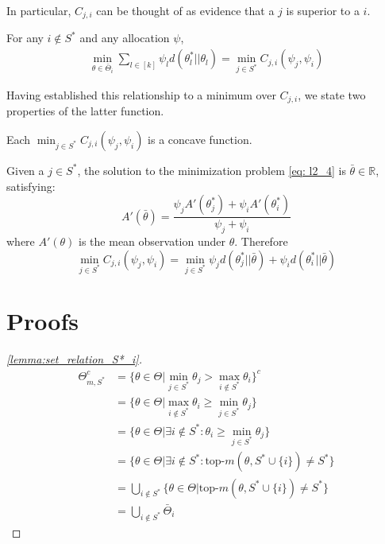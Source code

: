 In particular, $C_{j, i}$ can be thought of as evidence that a $j$ is superior to a $i$.

\begin{lemma}\label{lemma:kl_to_C}
  For any $i \notin S^*$ and any allocation $\psi$,
  \begin{align}
    \min_{\theta \in \bar{\Theta}_i} \sum_{l \in [k]}\psi_l d(\theta^*_l||\theta_l) = \min_{j \in S^*} C_{j, i}(\psi_j, \psi_i)
  \end{align}
\end{lemma}

Having established this relationship to a minimum over $C_{j, i}$, we state two properties of the latter function.

\begin{lemma}\label{lemma:C_concave}
  Each $\min_{j \in S^*} C_{j, i}(\psi_j, \psi_i)$ is a concave function.
\end{lemma}

\begin{lemma}\label{lemma:C_unique_solution}
  Given a $j \in S^*$, the solution to the minimization problem \eqref{eq: l2_4} is $\bar{\theta} \in \mathbb{R}$, satisfying:
  \[A'(\bar{\theta}) = \frac{\psi_j A'(\theta_j^*) + \psi_i A'(\theta_i^*)}{\psi_j + \psi_i}\]
  where $A'(\theta)$ is the mean observation under $\theta$. Therefore
  \[\min_{j \in S^*} C_{j, i}(\psi_j, \psi_i) = \min_{j \in S^*} \psi_j d(\theta^*_j || \bar{\theta}) + \psi_i d(\theta^*_i || \bar{\theta})\]
\end{lemma}

\section{Proofs}
\begin{proof}[\ref{lemma:set_relation_S*_i}]
  \begin{align}
    \Theta_{m, S^*}^c &= \{\theta \in \Theta | \min_{j \in S^*} \theta_j > \max_{i \notin S^*} \theta_i \}^c \\
    &= \{\theta \in \Theta | \max_{i \notin S^*} \theta_i \geq \min_{j \in S^*} \theta_j\} \\
    &= \{\theta \in \Theta | \exists i \notin S^*: \theta_i \geq \min_{j \in S^*} \theta_j\} \\
    &= \{\theta \in \Theta | \exists i \notin S^*: \text{top-}m(\theta, S^* \cup \{i\}) \neq S^*\} \\
    &= \bigcup_{i \notin S^*} \{\theta \in \Theta | \text{top-}m(\theta, S^* \cup \{i\}) \neq S^*\} \\
    &= \bigcup_{i \notin S^*} \bar{\Theta}_i
  \end{align}
\end{proof}

